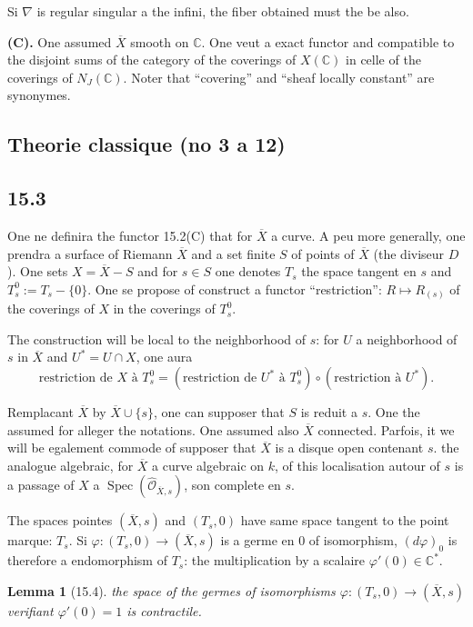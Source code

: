 \documentclass[12pt,a4paper]{article}
\theoremstyle{plain}
\newtheorem{lemma}[theorem]{Lemma}
\theoremstyle{definition}
\theoremstyle{remark}
\DeclareMathOperator{\Spec}{Spec}
\newcommand{\cO}{\mathcal{O}}
\newcommand{\bC}{\mathbb{C}}
\begin{document}
Si $\nabla$ is regular singular a the infini, the fiber obtained must the be also.

\textbf{(C).} One assumed $\overline{X}$ smooth on $\bC$. One veut a exact functor and compatible to the disjoint sums of the category of the coverings of $X(\bC)$ in celle of the coverings of $N_J(\bC)$. Noter that ``covering'' and ``sheaf locally constant'' are synonymes.

\subsection*{Theorie classique (no 3 a 12)}

\subsection*{15.3}

One ne definira the functor 15.2(C) that for $\overline{X}$ a curve. A peu more generally, one prendra a surface of Riemann $\overline{X}$ and a set finite $S$ of points of $\overline{X}$ (the diviseur $D$). One sets $X = \overline{X} - S$ and for $s \in S$ one denotes $T_s$ the space tangent en $s$ and $T_s^0 := T_s - \{0\}$. One se propose of construct a functor ``restriction'': $R \mapsto R_{(s)}$ of the coverings of $X$ in the coverings of $T_s^0$.

The construction will be local to the neighborhood of $s$: for $U$ a neighborhood of $s$ in $\overline{X}$ and $U^* = U \cap X$, one aura
\[
\text{restriction de } X \text{ à } T_s^0 = (\text{restriction de } U^* \text{ à } T_s^0) \circ (\text{restriction à } U^*).
\]

Remplacant $\overline{X}$ by $\overline{X} \cup \{s\}$, one can supposer that $S$ is reduit a $s$. One the assumed for alleger the notations. One assumed also $\overline{X}$ connected. Parfois, it we will be egalement commode of supposer that $\overline{X}$ is a disque open contenant $s$. the analogue algebraic, for $\overline{X}$ a curve algebraic on $k$, of this localisation autour of $s$ is a passage of $X$ a $\Spec(\hat{\cO}_{\overline{X}, s})$, son complete en $s$.

The spaces pointes $(\overline{X}, s)$ and $(T_s, 0)$ have same space tangent to the point marque: $T_s$. Si $\varphi : (T_s, 0) \to (\overline{X}, s)$ is a germe en $0$ of isomorphism, $(d\varphi)_0$ is therefore a endomorphism of $T_s$: the multiplication by a scalaire $\varphi'(0) \in \bC^*$.

\begin{lemma}[15.4]
the space of the germes of isomorphisms $\varphi : (T_s, 0) \to (\overline{X}, s)$ verifiant $\varphi'(0) = 1$ is contractile.
\end{lemma}
\end{document}
